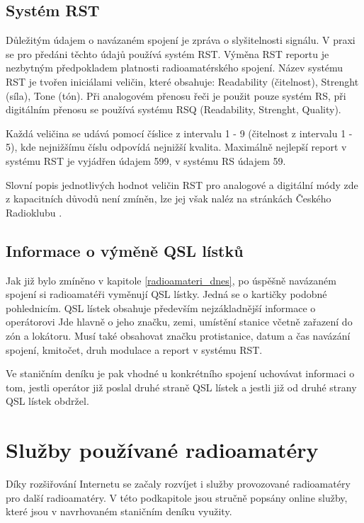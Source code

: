 \subsection{Systém RST}

Důležitým údajem o navázaném spojení je zpráva o slyšitelnosti signálu. V praxi se pro 
předáni těchto údajů používá systém RST. Výměna RST reportu je nezbytným předpokladem platnosti radioamatérského spojení.
Název systému RST je tvořen iniciálami veličin, které obsahuje: Readability (čitelnost), Strenght (síla), Tone (tón).
Při analogovém přenosu řeči je použit pouze systém RS, při digitálním přenosu se používá systému RSQ (Readability, Strenght, Quality).

Každá veličina se udává pomocí číslice z intervalu 1 - 9 (čitelnost z intervalu 1 - 5), kde nejnižšímu číslu odpovídá nejnižší kvalita.
Maximálně nejlepší report v systému RST je vyjádřen údajem 599, v systému RS údajem 59.

Slovní popis jednotlivých hodnot veličin RST pro analogové a digitální módy zde z kapacitních důvodů není zmíněn, lze jej však
naléz na stránkách Českého Radioklubu \cite{crk_rst}.

\subsection{Informace o výměně QSL lístků}

Jak již bylo zmíněno v kapitole \ref{radioamateri_dnes}, po úspěšně navázaném spojení si radioamatéři vyměnují QSL lístky.
Jedná se o kartičky podobné pohlednicím. QSL lístek obsahuje především nejzákladnější informace o operátorovi
Jde hlavně o jeho značku, zemi, umístění stanice včetně zařazení do zón a lokátoru.
Musí také obsahovat značku protistanice, datum a čas navázání spojení, kmitočet, druh modulace a report v systému RST. 

Ve staničním deníku je pak vhodné u konkrétního spojení uchovávat informaci o tom, jestli operátor již poslal druhé
straně QSL lístek a jestli již od druhé strany QSL lístek obdržel.


\section{Služby používané radioamatéry}
\label{radioamateri_sluzby}

Díky rozšiřování Internetu se začaly rozvíjet i služby provozované radioamatéry pro další radioamatéry. V této podkapitole
jsou stručně popsány online služby, které jsou v navrhovaném staničním deníku využity.

